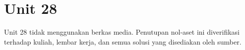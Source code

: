 \section*{Unit 28}
Unit 28 tidak menggunakan berkas media. Penutupan nol-aset ini diverifikasi terhadap kuliah, lembar kerja, dan semua solusi yang disediakan oleh sumber.
